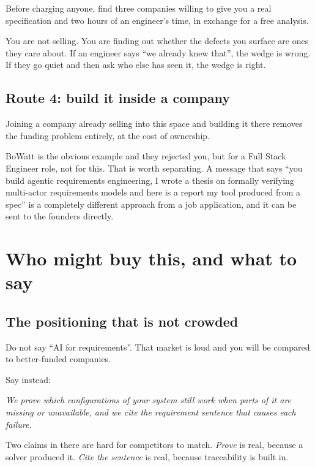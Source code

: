 \documentclass[11pt,a4paper]{article}
\begin{document}
Before charging anyone, find three companies willing to give you a real specification
and two hours of an engineer's time, in exchange for a free analysis.

You are not selling. You are finding out whether the defects you surface are ones they
care about. If an engineer says ``we already knew that'', the wedge is wrong. If they go
quiet and then ask who else has seen it, the wedge is right.

\subsection{Route 4: build it inside a company}

Joining a company already selling into this space and building it there removes the
funding problem entirely, at the cost of ownership.

BoWatt is the obvious example and they rejected you, but for a Full Stack Engineer role,
not for this. That is worth separating. A message that says ``you build agentic
requirements engineering, I wrote a thesis on formally verifying multi-actor requirements
models and here is a report my tool produced from a spec'' is a completely different
approach from a job application, and it can be sent to the founders directly.

\section{Who might buy this, and what to say}

\subsection{The positioning that is not crowded}

Do not say ``AI for requirements''. That market is loud and you will be compared to
better-funded companies.

Say instead:

\begin{keybox}
\emph{We prove which configurations of your system still work when parts of it are
missing or unavailable, and we cite the requirement sentence that causes each failure.}
\end{keybox}

Two claims in there are hard for competitors to match. \emph{Prove} is real, because a
solver produced it. \emph{Cite the sentence} is real, because traceability is built in.
\end{document}
